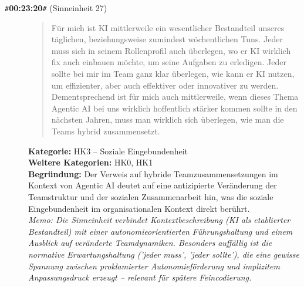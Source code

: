 \begin{description}
  \item[\texttt{\#}\textbf{00:23:20}\texttt{\#} (Sinneinheit 27)]
  \begin{quote}
  Für mich ist KI mittlerweile ein wesentlicher Bestandteil unseres täglichen, beziehungsweise zumindest wöchentlichen Tuns. Jeder muss sich in seinem Rollenprofil auch überlegen, wo er KI wirklich fix auch einbauen möchte, um seine Aufgaben zu erledigen. Jeder sollte bei mir im Team ganz klar überlegen, wie kann er KI nutzen, um effizienter, aber auch effektiver oder innovativer zu werden. Dementsprechend ist für mich auch mittlerweile, wenn dieses Thema Agentic AI bei uns wirklich hoffentlich stärker kommen sollte in den nächsten Jahren, muss man wirklich sich überlegen, wie man die Teams hybrid zusammensetzt.
  \end{quote}
  \textbf{Kategorie:} HK3 -- Soziale Eingebundenheit\\
  \textbf{Weitere Kategorien:} HK0, HK1\\
  \textbf{Begr\"undung:} Der Verweis auf hybride Teamzusammensetzungen im Kontext von Agentic AI deutet auf eine antizipierte Veränderung der Teamstruktur und der sozialen Zusammenarbeit hin, was die soziale Eingebundenheit im organisationalen Kontext direkt berührt.
  \\\textit{Memo: Die Sinneinheit verbindet Kontextbeschreibung (KI als etablierter Bestandteil) mit einer autonomieorientierten Führungshaltung und einem Ausblick auf veränderte Teamdynamiken. Besonders auffällig ist die normative Erwartungshaltung ('jeder muss', 'jeder sollte'), die eine gewisse Spannung zwischen proklamierter Autonomieförderung und implizitem Anpassungsdruck erzeugt – relevant für spätere Feincodierung.}
\end{description}
\medskip

